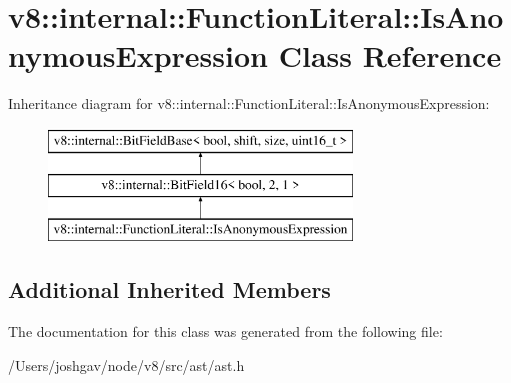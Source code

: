\hypertarget{classv8_1_1internal_1_1_function_literal_1_1_is_anonymous_expression}{}\section{v8\+:\+:internal\+:\+:Function\+Literal\+:\+:Is\+Anonymous\+Expression Class Reference}
\label{classv8_1_1internal_1_1_function_literal_1_1_is_anonymous_expression}
Inheritance diagram for v8\+:\+:internal\+:\+:Function\+Literal\+:\+:Is\+Anonymous\+Expression\+:\begin{figure}[H]
\begin{center}
\leavevmode
\includegraphics[height=3.000000cm]{classv8_1_1internal_1_1_function_literal_1_1_is_anonymous_expression}
\end{center}
\end{figure}
\subsection*{Additional Inherited Members}


The documentation for this class was generated from the following file\+:\begin{DoxyCompactItemize}
\item 
/\+Users/joshgav/node/v8/src/ast/ast.\+h\end{DoxyCompactItemize}
